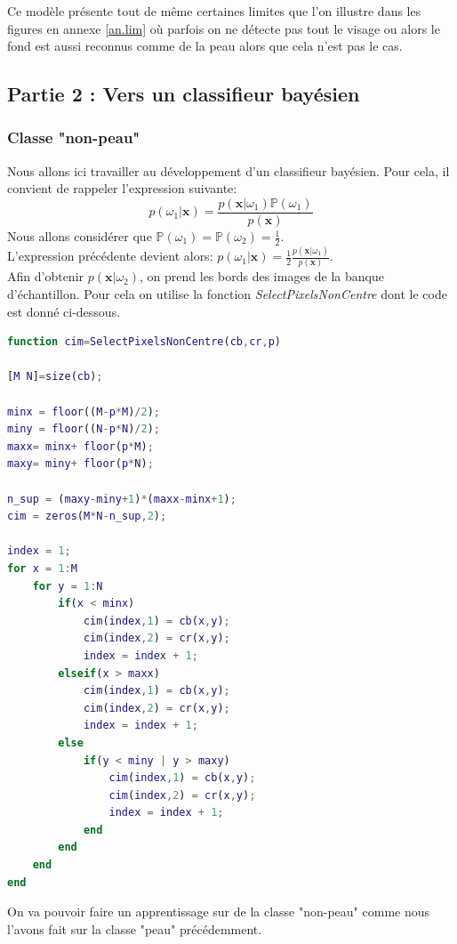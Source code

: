 \documentclass[11pt,a4paper]{article}
\begin{document}
Ce modèle présente tout de même certaines limites que l'on illustre dans les figures en annexe \ref{an.lim} où parfois on ne détecte pas tout le visage ou alors le fond est aussi reconnus comme de la peau alors que cela n'est pas le cas.

\subsection{Partie 2 : Vers un classifieur bayésien}
\subsubsection{Classe "non-peau"}
Nous allons ici travailler au développement d'un classifieur bayésien. Pour cela, il convient de rappeler l'expression suivante:
$$
p(\omega_1|\textbf{x}) = \frac{p(\textbf{x}|\omega_1)\mathbb{P}(\omega_1)}{p(\textbf{x})}
$$
Nous allons considérer que $\mathbb{P}(\omega_1) = \mathbb{P}(\omega_2) = \frac{1}{2}$.
\\
L'expression précédente devient alors: $p(\omega_1|\textbf{x})=\frac{1}{2}\frac{p(\textbf{x}|\omega_1)}{p(\textbf{x})}$.
\\
Afin d'obtenir $p(\textbf{x}|\omega_2)$, on prend les bords des images de la banque d'échantillon. Pour cela on utilise la fonction \emph{SelectPixelsNonCentre} dont le code est donné ci-dessous. 

\noindent\hrulefill
\begin{lstlisting}[language=matlab]
function cim=SelectPixelsNonCentre(cb,cr,p)

[M N]=size(cb);

minx = floor((M-p*M)/2);
miny = floor((N-p*N)/2);
maxx= minx+ floor(p*M);
maxy= miny+ floor(p*N);

n_sup = (maxy-miny+1)*(maxx-minx+1);
cim = zeros(M*N-n_sup,2);

index = 1;
for x = 1:M
    for y = 1:N
        if(x < minx)
            cim(index,1) = cb(x,y);
            cim(index,2) = cr(x,y);
            index = index + 1;
        elseif(x > maxx)
            cim(index,1) = cb(x,y);
            cim(index,2) = cr(x,y);
            index = index + 1;
        else
            if(y < miny | y > maxy)
                cim(index,1) = cb(x,y);
                cim(index,2) = cr(x,y);
                index = index + 1;
            end
        end
    end
end
\end{lstlisting}
\noindent\hrulefill

On va pouvoir faire un apprentissage sur de la classe "non-peau" comme nous l'avons fait sur la classe "peau" précédemment.
\end{document}

